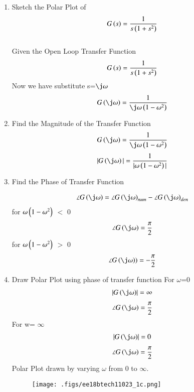 \begin{enumerate}[label=\thesection.\arabic*.,ref=\thesection.\theenumi]
\item
Sketch the Polar Plot of
\begin{align}
G\left(s\right) = \frac{1}{s\left(1+s^{2}\right)}
\end{align}
\\
\solution  
Given the Open Loop Transfer Function
\begin{align}
G\left(s\right) = \frac{1}{s\left(1+s^{2}\right)}
\end{align}
Now we have substitute s=$\j\omega$
\begin{align}
G\brak{\j\omega} =   \frac{1}{\j\omega\brak{1-{\omega}^{2}}}
\end{align}

\item
Find the Magnitude of the Transfer Function
\begin{align}
G\brak{\j\omega} =   \frac{1}{\j\omega\brak{1-{\omega}^{2}}}
\end{align}
\begin{align}
      |G\brak{\j\omega}| = \frac{1}{|\omega\brak{1-{\omega}^{2}}|}
\end{align}
\item
Find the Phase of Transfer Function

\begin{align}
    \angle G\brak{\j\omega} = \angle G\brak{\j\omega}_{num} - \angle G\brak{\j\omega}_{den}
\end{align}
for $\omega\left(1-{\omega}^{2}\right)$ $<$ 0
\begin{align}
    \angle G\brak{\j\omega} = \frac{\pi}{2}
\end{align}
for $\omega\left(1-{\omega}^{2}\right)$ $>$ 0
\begin{align}
    \angle G\brak{\j\omega}) = -\frac{\pi}{2}
\end{align}
\item
Draw Polar Plot using phase of transfer function
For $\omega$=0 
\begin{align}
    \abs{G\brak{\j\omega}} = \infty
    \end{align}
\begin{align}
    \angle G\brak{\j\omega} = \frac{\pi}{2}
\end{align}
For w= $\infty$
\begin{align}
    \abs{G\brak{\j\omega}} = 0
    \end{align}
\begin{align}
    \angle G\brak{\j\omega} = \frac{\pi}{2}
\end{align}
Polar Plot drawn by varying $\omega$ from 0 to $\infty$.
\begin{figure}[!h]
  \texttt{[image: .figs/ee18btech11023\_1c.png]}
  \caption{}
  \label{ee18btech11023}
\end{figure}


\end{enumerate}
